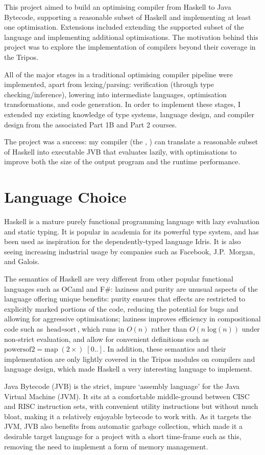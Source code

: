 \documentclass[dissertation.tex]{subfiles}
\begin{document}
This project aimed to build an optimising compiler from Haskell to Java Bytecode, supporting a reasonable subset of Haskell and implementing at least one optimisation. Extensions included extending the supported subset of the language and implementing additional optimisations. The motivation behind this project was to explore the implementation of compilers beyond their coverage in the Tripos.

All of the major stages in a traditional optimising compiler pipeline were implemented, apart from lexing/parsing: verification (through type checking/inference), lowering into intermediate languages, optimisation transformations, and code generation. In order to implement these stages, I extended my existing knowledge of type systems, language design, and compiler design from the associated Part 1B and Part 2 courses.

The project was a success: my compiler (the \compilerlongname, \compilername) can translate a reasonable subset of Haskell into executable JVB that evaluates lazily, with optimisations to improve both the size of the output program and the runtime performance.

\section{Language Choice}
{
    Haskell is a mature purely functional programming language with lazy evaluation and static typing. It is popular in academia for its powerful type system, and has been used as inspiration for the dependently-typed language Idris\cite{Idris}. It is also seeing increasing industrial usage by companies such as Facebook\cite{FacebookHaskell}, J.P.\ Morgan\cite{JPHaskell}, and Galois\cite{GaloisHaskell}.

    The semantics of Haskell are very different from other popular functional languages such as OCaml and F\#: laziness and purity are unusual aspects of the language offering unique benefits: purity ensures that effects are restricted to explicitly marked portions of the code, reducing the potential for bugs and allowing for aggressive optimisations; laziness improves efficiency in compositional code such as \(\text{head} \circ \text{sort}\), which runs in \(O(n)\) rather than \(O(n\;\text{log}(n))\) under non-strict evaluation, and allow for convenient definitions such as \(\text{powersof2} = \text{map}\;(2\times)\;[0..]\). In addition, these semantics and their implementation are only lightly covered in the Tripos modules on compilers and language design, which made Haskell a very interesting language to implement.

    Java Bytecode (JVB) is the strict, impure `assembly language' for the Java Virtual Machine (JVM). It sits at a comfortable middle-ground between CISC and RISC instruction sets, with convenient utility instructions but without much bloat, making it a relatively enjoyable bytecode to work with. As it targets the JVM, JVB also benefits from automatic garbage collection, which made it a desirable target language for a project with a short time-frame such as this, removing the need to implement a form of memory management.
}
\end{document}
